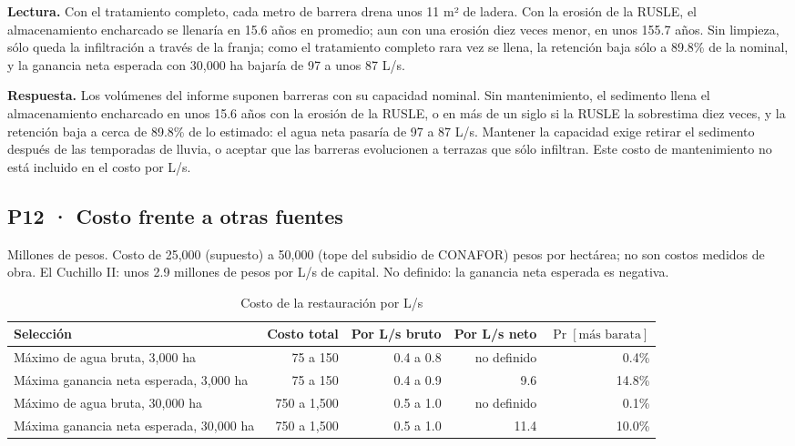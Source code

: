 \documentclass[11pt,letterpaper]{article}
\newcommand{\lectura}[1]{\par\noindent\textcolor{naranja}{\textbf{Lectura.}} #1\par}
\newcommand{\respuesta}[1]{\begin{cajarespuesta}\textbf{\color{naranja}Respuesta.} #1\end{cajarespuesta}}
\begin{document}
\lectura{Con el tratamiento completo, cada metro de barrera drena unos 11 m² de ladera. Con la erosión de la RUSLE, el almacenamiento encharcado se llenaría en 15.6 años en promedio; aun con una erosión diez veces menor, en unos 155.7 años. Sin limpieza, sólo queda la infiltración a través de la franja; como el tratamiento completo rara vez se llena, la retención baja sólo a 89.8\% de la nominal, y la ganancia neta esperada con 30,000 ha bajaría de 97 a unos 87 L/s.}

\respuesta{Los volúmenes del informe suponen barreras con su capacidad nominal. Sin mantenimiento, el sedimento llena el almacenamiento encharcado en unos 15.6 años con la erosión de la RUSLE, o en más de un siglo si la RUSLE la sobrestima diez veces, y la retención baja a cerca de 89.8\% de lo estimado: el agua neta pasaría de 97 a 87 L/s. Mantener la capacidad exige retirar el sedimento después de las temporadas de lluvia, o aceptar que las barreras evolucionen a terrazas que sólo infiltran. Este costo de mantenimiento no está incluido en el costo por L/s.}

\subsection{P12 · Costo frente a otras fuentes}\label{res:p12}

\begin{table}[H]\centering\small
\caption{Costo de la restauración por L/s}\label{tab:costo}
{\color{gris}Millones de pesos. Costo de 25,000 (supuesto) a 50,000 (tope del subsidio de CONAFOR) pesos por hectárea; no son costos medidos de obra. El Cuchillo II: unos 2.9 millones de pesos por L/s de capital. No definido: la ganancia neta esperada es negativa.\par}\smallskip
\begin{tabularx}{\linewidth}{Xrrrr}
\toprule
Selección & Costo total & Por L/s bruto & Por L/s neto & $\Pr[\text{más barata}]$ \\
\midrule
Máximo de agua bruta, 3,000 ha & 75 a 150 & 0.4 a 0.8 & no definido & 0.4\% \\
Máxima ganancia neta esperada, 3,000 ha & 75 a 150 & 0.4 a 0.9 & 9.6 & 14.8\% \\
Máximo de agua bruta, 30,000 ha & 750 a 1,500 & 0.5 a 1.0 & no definido & 0.1\% \\
Máxima ganancia neta esperada, 30,000 ha & 750 a 1,500 & 0.5 a 1.0 & 11.4 & 10.0\% \\
\bottomrule
\end{tabularx}
\end{table}
\end{document}
